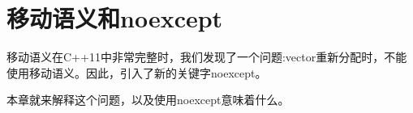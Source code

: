 \chapter{移动语义和noexcept}
移动语义在C++11中非常完整时，我们发现了一个问题:vector重新分配时，不能使用移动语义。因此，引入了新的关键字noexcept。

本章就来解释这个问题，以及使用noexcept意味着什么。




